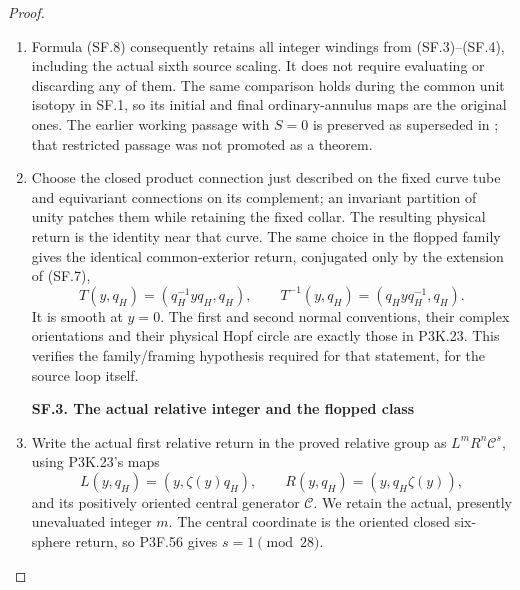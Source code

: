 \begin{proof}
\begin{enumerate}[label=\arabic*.]
\item Formula (SF.8) consequently retains all integer windings from
(SF.3)--(SF.4), including the actual sixth source scaling. It does not
require evaluating or discarding any of them. The same comparison
holds during the common unit isotopy in SF.1, so its initial and
final ordinary-annulus maps are the original ones. The earlier
working passage with \(S=0\) is preserved as superseded in
;
that restricted passage was not promoted as a theorem.

\item Choose the closed product connection just described on the fixed
curve tube and equivariant connections on its complement; an
invariant partition of unity patches them while retaining the fixed
collar. The resulting physical return is the identity near that
curve. The same choice in the flopped family gives the identical
common-exterior return, conjugated only by the extension of (SF.7),
\[
 T(y,q_H)=(q_H^{-1}yq_H,q_H),\qquad
 T^{-1}(y,q_H)=(q_Hyq_H^{-1},q_H).                         \tag{SF.9}
\]
It is smooth at \(y=0\). The first and second normal conventions,
their complex orientations and their physical Hopf circle are exactly
those in P3K.23. This verifies the family/framing hypothesis required
for that statement, for the source loop itself.

\par

\medskip\noindent\textbf{SF.3. The actual relative integer and the flopped class}

\par\nobreak

\item Write the actual first relative return in the proved relative group
as \(L^mR^n\mathcal C^s\), using P3K.23's maps
\[
 L(y,q_H)=(y,\zeta(y)q_H),\qquad
 R(y,q_H)=(y,q_H\zeta(y)),
\]
and its positively oriented central generator \(\mathcal C\).
We retain the actual, presently unevaluated integer \(m\).
The central coordinate is the oriented closed six-sphere return,
so P3F.56 gives \(s=1\pmod {28}\).


\end{enumerate}
\end{proof}
